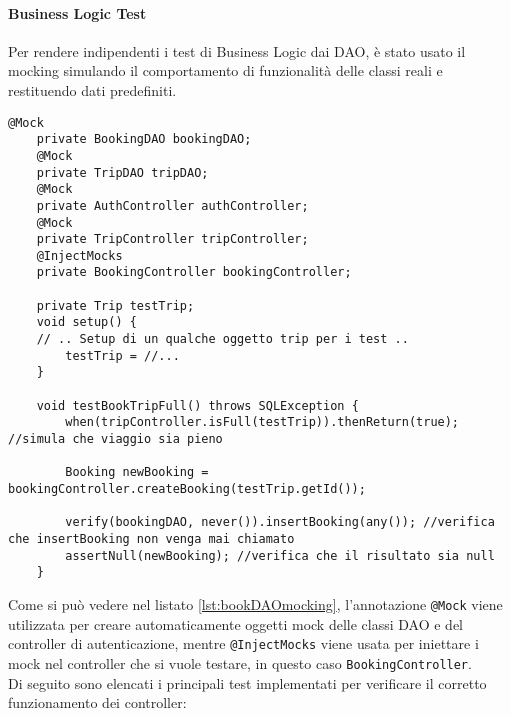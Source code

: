 \paragraph{Business Logic Test} \label{subsec:business-logic-test}
Per rendere indipendenti i test di Business Logic dai DAO, è stato usato il mocking simulando il comportamento di funzionalità delle classi reali e restituendo dati predefiniti.\\
\begin{lstlisting}[style=java, caption={Esempio uso di mocking  in BookingControllerTest.}, label={lst:bookDAOmocking}]
    @Mock
    private BookingDAO bookingDAO;
    @Mock
    private TripDAO tripDAO;
    @Mock
    private AuthController authController;
    @Mock
    private TripController tripController;
    @InjectMocks
    private BookingController bookingController;
    
    private Trip testTrip;
    void setup() {
    // .. Setup di un qualche oggetto trip per i test ..
        testTrip = //...
    }
    
    void testBookTripFull() throws SQLException {
        when(tripController.isFull(testTrip)).thenReturn(true); //simula che viaggio sia pieno
        
        Booking newBooking = bookingController.createBooking(testTrip.getId());
        
        verify(bookingDAO, never()).insertBooking(any()); //verifica che insertBooking non venga mai chiamato
        assertNull(newBooking); //verifica che il risultato sia null
    }
\end{lstlisting}
Come si può vedere nel listato \ref{lst:bookDAOmocking}, l'annotazione \texttt{@Mock} viene utilizzata per creare automaticamente oggetti mock delle classi DAO e del controller di autenticazione, mentre \texttt{@InjectMocks} viene usata per iniettare i mock nel controller che si vuole testare, in questo caso \texttt{BookingController}.\\
Di seguito sono elencati i principali test implementati per verificare il corretto funzionamento dei controller:
